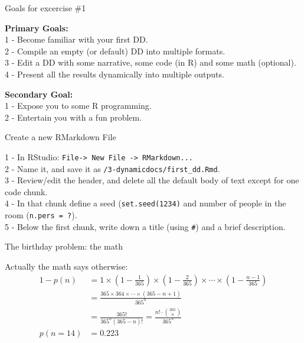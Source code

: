 \documentclass[ignorenonframetext,]{beamer}
\begin{document}
\begin{frame}{Goals for excercise \#1}
\protect\hypertarget{goals-for-excercise-1}{}

\textbf{Primary Goals:}\\
1 - Become familiar with your first DD.\\
2 - Compile an empty (or default) DD into multiple formats.\\
3 - Edit a DD with some narrative, some code (in R) and some math
(optional).\\
4 - Present all the results dynamically into multiple outputs.

\pause

\textbf{Secondary Goal:}\\
1 - Expose you to some R programming.\\
2 - Entertain you with a fun problem.

\end{frame}

\begin{frame}[fragile]{Create a new RMarkdown File}
\protect\hypertarget{create-a-new-rmarkdown-file}{}

1 - In RStudio:
\texttt{File-\textgreater{}\ New\ File\ -\textgreater{}\ RMarkdown...}\\
2 - Name it, and save it as \texttt{/3-dynamicdocs/first\_dd.Rmd}.\\
3 - Review/edit the header, and delete all the default body of text
except for one code chunk.\\
4 - In that chunk define a seed (\texttt{set.seed(1234)} and number of
people in the room (\texttt{n.pers\ =\ ?}).\\
5 - Below the first chunk, write down a title (using \texttt{\#}) and a
brief description.

\end{frame}

\begin{frame}{The birthday problem: the math}
\protect\hypertarget{the-birthday-problem-the-math}{}

Actually the math says otherwise: \begin{align} 
 1 -  p(n) &= 1 \times \left(1-\frac{1}{365}\right) \times \left(1-\frac{2}{365}\right) \times \cdots \times \left(1-\frac{n-1}{365}\right) \nonumber  \\  &= \frac{ 365 \times 364 \times \cdots \times (365-n+1) }{ 365^n } \nonumber \\ &= \frac{ 365! }{ 365^n (365-n)!} = \frac{n!\cdot\binom{365}{n}}{365^n}\\
p(n= 14) &= 0.223  \nonumber
\end{align}

\end{frame}
\end{document}

